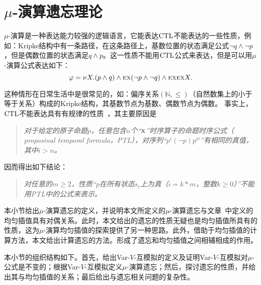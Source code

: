 \section{$\mu$-演算遗忘理论}
\label{chapter03:sec:muforget}
$\mu$-演算是一种表达能力较强的逻辑语言，它能表达$\textrm{CTL}$不能表达的一些性质，例如：Kripke结构中有一条路径，在这条路径上，基数位置的状态满足公式$\neg q \wedge \neg p$，但是偶数位置的状态满足$q \wedge p$。这一性质不能用$\textrm{CTL}$公式来表达，但是可以用$\mu$-演算公式表达如下：
$$\varphi = \nu X.(p \wedge q) \wedge \textsc{e} \textsc{x}(\neg p \wedge \neg q) \wedge \textsc{e} \textsc{x} \textsc{e} \textsc{x} X.$$

这种情形在日常生活中是很常见的，如：偏序关系$(\mathbb{N}, \leq)$（自然数集上的小于等于关系）构成的Kripke结构，其基数节点为基数、偶数节点为偶数。
事实上，$\textrm{CTL}$不能表达具有有规律的性质~\cite{DBLP:journals/iandc/Wolper83}，其主要原因是
\begin{quote}
	\emph{对于给定的原子命题$p$，任意包含$n$个“$\textsc{x}$”时序算子的命题时序公式（ proposinal temporal formula，PTL），对序列“$p^i(\neg p) p^w$”有相同的真值，其中$i > n$。%
	}
\end{quote}

因而得出如下结论：
\begin{quote}
	\emph{对任意的$m\geq 2$，性质“$p$在所有状态$s_i$上为真（$i = k*m$，整数$k\geq 0$）”不能用PTL中的公式来表示。
	}
\end{quote}





本小节给出$\mu$-演算遗忘的定义，并说明本文所定义的$\mu$-演算遗忘与文章~\cite{d2006modal}中定义的均匀插值具有对偶关系。此时，本文给出的遗忘的性质无疑也是均匀插值所具有的性质，这为$\mu$-演算均匀插值的探索提供了另一种思路。此外，借助于均匀插值的计算方法，本文给出计算遗忘的方法。形成了遗忘和均匀插值之间相辅相成的作用。

本小节的组织结构如下。首先，给出Var-$V$-互模拟的定义及证明Var-$V$-互模拟对$\mu$-公式是不变的；根据Var-$V$-互模拟定义$\mu$-演算遗忘；然后，探讨遗忘的性质，并给出其与均匀插值的关系；最后给出与遗忘相关问题的复杂性。

